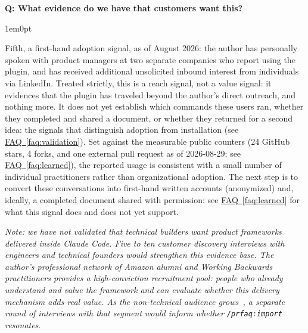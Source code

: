 \documentclass[11pt,letterpaper]{article}
\newcounter{faqnum}
\newenvironment{faqpair}[1]{%
  \needspace{4\baselineskip}%
  \vspace{0.5em}%
  \refstepcounter{faqnum}%
  \noindent\textbf{\color{SectionBlue}Q\thefaqnum: #1}\par\nopagebreak[4]%
  \vspace{0.2em}%
  \begin{adjustwidth}{1em}{0pt}%
  \setlength{\parindent}{0pt}%
}{%
  \end{adjustwidth}%
  \vspace{0.5em}%
}
\newcommand{\faqref}[1]{\hyperref[#1]{FAQ~\ref*{#1}}}
\begin{document}
\begin{faqpair}{What evidence do we have that customers want this?}
  Fifth, a first-hand adoption signal, as of August 2026: the author has personally spoken with product managers at two separate companies who report using the plugin, and has received additional unsolicited inbound interest from individuals via LinkedIn. Treated strictly, this is a reach signal, not a value signal: it evidences that the plugin has traveled beyond the author's direct outreach, and nothing more. It does not yet establish which commands these users ran, whether they completed and shared a document, or whether they returned for a second idea: the signals that distinguish adoption from installation (see \faqref{faq:validation}). Set against the measurable public counters (24 GitHub stars, 4 forks, and one external pull request as of 2026-08-29; see \faqref{faq:learned}), the reported usage is consistent with a small number of individual practitioners rather than organizational adoption. The next step is to convert these conversations into first-hand written accounts (anonymized) and, ideally, a completed document shared with permission: see \faqref{faq:learned} for what this signal does and does not yet support.

  \textit{Note: we have not validated that technical builders want product frameworks delivered inside Claude Code. Five to ten customer discovery interviews with engineers and technical founders would strengthen this evidence base. The author's professional network of Amazon alumni and Working Backwards practitioners provides a high-conviction recruitment pool: people who already understand and value the framework and can evaluate whether this delivery mechanism adds real value. As the non-technical audience grows~\cite{nyt2026claudecode}, a separate round of interviews with that segment would inform whether \texttt{/prfaq:import} resonates.}
\end{faqpair}
\end{document}
